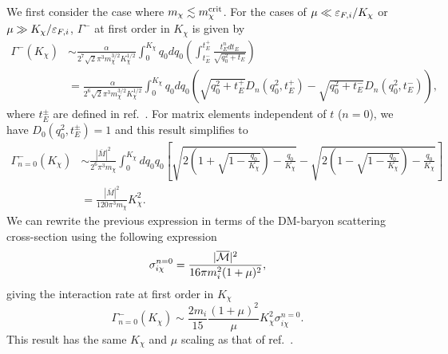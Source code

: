 We first consider the case where $m_\chi \lesssim m_\chi^{\rm crit}$. 
For the cases of $\mu \ll \varepsilon_{F,i}/K_\chi$ or $\mu \gg K_\chi/\varepsilon_{F,i}$, 
$\Gamma^{-}$ at first order in $K_\chi$ is given by
% 
\begin{align}
\Gamma^{-}(K_\chi) &\sim \frac{\alpha}{2^7\sqrt{2}\pi^3m_\chi^{3/2}K_\chi^{1/2}}\int_0^{K_\chi}q_0 dq_0 \left(\int_{t_{E}^{-}}^{t_{E}^{+}} \frac{t_E^n dt_E }{\sqrt{q_0^2+t_E}} \right)\\
&= \frac{\alpha}{2^6\sqrt{2}\pi^3m_\chi^{3/2}K_\chi^{1/2}}\int_0^{K_\chi}q_0 dq_0 \left(\sqrt{q_0^2+t_E^{+}}D_n(q_0^2,t_E^{+})-\sqrt{q_0^2+t_E^{-}}D_n(q_0^2,t_E^{-})\right), \label{eq:intratelowe}
\end{align}
% 
where $t_E^\pm$ are defined in ref.~\cite{Bell:2020jou_sep_ImprovedTreatmentDark}. 
For matrix elements independent of $t$ ($n=0$), we have $D_0(q_0^2,t_E^{\pm})=1$  and this result simplifies to
% 
\begin{align}
\Gamma_{n=0}^{-}(K_\chi) 
&\sim  \frac{|\overline{M}|^2}{2^6\pi^3m_\chi}\int_{0}^{K_\chi} dq_0 q_0 \left[\sqrt{2\left(1+\sqrt{1-\frac{q_0}{K_\chi}}\right)-\frac{q_0}{K_\chi}}-\sqrt{2\left(1-\sqrt{1-\frac{q_0}{K_\chi}}\right)-\frac{q_0}{K_\chi}}\right] \nonumber \\
&= \frac{|\overline{M}|^2}{120\pi^3m_\chi}K_\chi^2.
\end{align}
% 
We can rewrite the previous expression in terms of the DM-baryon scattering cross-section using the following expression
\begin{equation}
\sigma_{i\chi}^{n=0} = \frac{|\overline{\mathcal M}|^2}{16\pi m_i^2 (1+\mu)^2}, 
\label{eq:intraten0}
\end{equation}
giving the interaction rate at first order in $K_\chi$
\begin{equation}
\Gamma_{n=0}^{-}(K_\chi)  \sim \frac{2 m_i}{15}\frac{(1+\mu)^2}{\mu}K_\chi^2 \sigma_{i\chi}^{n=0}.
\end{equation}
This result has the same $K_\chi$ and $\mu$ scaling as that of ref.~\cite{Bertoni:2013bsa_dec_DarkMatterThermalization}.



